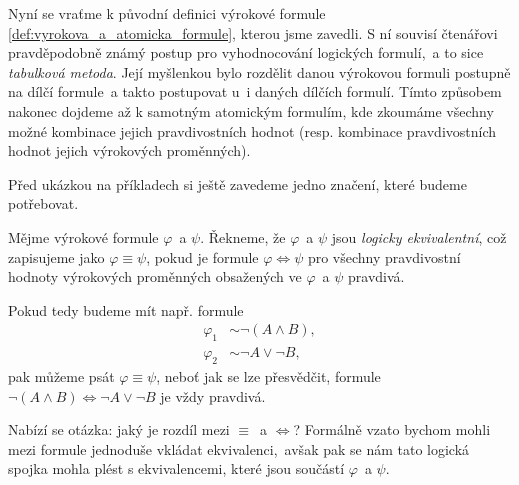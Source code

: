 Nyní se vraťme k původní definici výrokové formule \ref{def:vyrokova_a_atomicka_formule}, kterou jsme zavedli. S ní souvisí čtenářovi pravděpodobně známý postup pro vyhodnocování logických formulí,~a to sice \emph{tabulková metoda}. Její myšlenkou bylo rozdělit danou výrokovou formuli postupně na dílčí formule~a takto postupovat u~i daných dílčích formulí. Tímto způsobem nakonec dojdeme až k samotným atomickým formulím, kde zkoumáme všechny možné kombinace jejich pravdivostních hodnot (resp. kombinace pravdivostních hodnot jejich výrokových proměnných).\par

Před ukázkou na příkladech si ještě zavedeme jedno značení, které budeme potřebovat.
\begin{definition}
    Mějme výrokové formule $\varphi$~a $\psi$. Řekneme, že $\varphi$~a $\psi$ jsou \emph{logicky ekvivalentní}, což zapisujeme jako $\varphi\equiv\psi$, pokud je formule $\varphi \iff \psi$ pro všechny pravdivostní hodnoty výrokových proměnných obsažených ve $\varphi$~a $\psi$ pravdivá.
\end{definition}

Pokud tedy budeme mít např. formule
\begin{align*}
    \varphi_1 &\sim \neg (A \land B),\\
    \varphi_2 &\sim \neg A \lor \neg B,
\end{align*}
pak můžeme psát $\varphi\equiv\psi$, neboť jak se lze přesvědčit, formule $\neg (A \land B) \iff \neg A \lor \neg B$ je vždy pravdivá.\par
Nabízí se otázka: jaký je rozdíl mezi $\equiv$~a $\iff$? Formálně vzato bychom mohli mezi formule jednoduše vkládat ekvivalenci,~avšak pak se nám tato logická spojka mohla plést s ekvivalencemi, které jsou součástí $\varphi$~a $\psi$.

